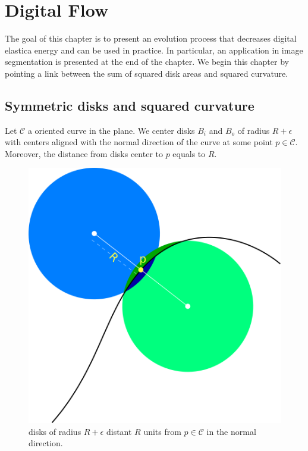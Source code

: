 \chapter{Digital Flow}
\label{chapter:digital-flow}

The goal of this chapter is to present an evolution process that decreases digital elastica energy and can be used in practice. In particular, an application in image segmentation is presented at the end of the chapter. We begin this chapter by pointing a link between the sum of squared disk areas and squared curvature.

\section{Symmetric disks and squared curvature}

Let $\mathcal{C}$ a oriented curve in the plane. We center disks $B_i$ and $B_o$ of radius $R+\epsilon$ with centers aligned with the normal direction of the curve at some point $p \in \mathcal{C}$. Moreover, the distance from disks center to $p$ equals to $R$.

\begin{figure}[h!]\label{fig:r-separated-disks}
\center
\includegraphics[scale=0.35]{figures/chapter5/max-energy/r-separated-disks.png}
\caption{disks of radius $R+\epsilon$ distant $R$ units from $p\in \mathcal{C}$ in the normal direction.}
\end{figure}

